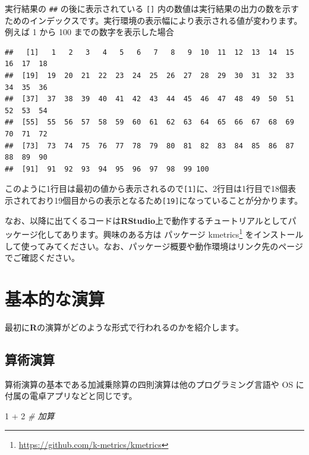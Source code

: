 \documentclass[
  12pt,
]{book}
\newenvironment{Shaded}{\begin{snugshade}}{\end{snugshade}}
\newcommand{\CommentTok}[1]{\textcolor[rgb]{0.56,0.35,0.01}{\textit{#1}}}
\newcommand{\DecValTok}[1]{\textcolor[rgb]{0.00,0.00,0.81}{#1}}
\newcommand{\SpecialCharTok}[1]{\textcolor[rgb]{0.00,0.00,0.00}{#1}}
\DeclareRobustCommand{\href}[2]{#2\footnote{\url{#1}}}
\begin{document}
実行結果の \texttt{\#\#} の後に表示されている \texttt{{[}{]}} 内の数値は実行結果の出力の数を示すためのインデックスです。実行環境の表示幅により表示される値が変わります。例えば 1 から 100 までの数字を表示した場合

\begin{verbatim}
##   [1]   1   2   3   4   5   6   7   8   9  10  11  12  13  14  15  16  17  18
##  [19]  19  20  21  22  23  24  25  26  27  28  29  30  31  32  33  34  35  36
##  [37]  37  38  39  40  41  42  43  44  45  46  47  48  49  50  51  52  53  54
##  [55]  55  56  57  58  59  60  61  62  63  64  65  66  67  68  69  70  71  72
##  [73]  73  74  75  76  77  78  79  80  81  82  83  84  85  86  87  88  89  90
##  [91]  91  92  93  94  95  96  97  98  99 100
\end{verbatim}

このように1行目は最初の値から表示されるので\texttt{{[}1{]}}に、2行目は1行目で18個表示されており19個目からの表示となるため\texttt{{[}19{]}}になっていることが分かります。

なお、以降に出てくるコードは\textbf{RStudio}上で動作するチュートリアルとしてパッケージ化してあります。興味のある方は \href{https://github.com/k-metrics/kmetrics}{パッケージ kmetrics} をインストールして使ってみてください。なお、パッケージ概要や動作環境はリンク先のページでご確認ください。

\hypertarget{ux57faux672cux7684ux306aux6f14ux7b97}{%
\section{基本的な演算}\label{ux57faux672cux7684ux306aux6f14ux7b97}}

最初に\textbf{R}の演算がどのような形式で行われるのかを紹介します。

\hypertarget{ux7b97ux8853ux6f14ux7b97}{%
\subsection{算術演算}\label{ux7b97ux8853ux6f14ux7b97}}

算術演算の基本である加減乗除算の四則演算は他のプログラミング言語や OS に付属の電卓アプリなどと同じです。

\begin{Shaded}
\begin{Highlighting}[numbers=left,,]
\DecValTok{1} \SpecialCharTok{+} \DecValTok{2}     \CommentTok{\# 加算}
\end{Highlighting}
\end{Shaded}
\end{document}
